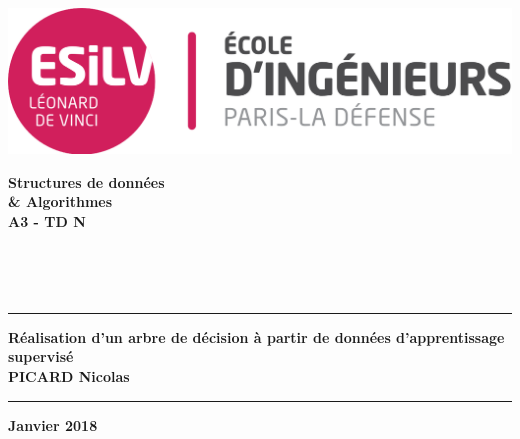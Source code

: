 \begin{titlepage}
	\begin{minipage}[c]{.46\linewidth}
		\begin{flushleft}
			\noindent
			\includegraphics[scale=0.13]{./img/Logo_ESILV.png}
		\end{flushleft}
	\end{minipage} \hfill
	\begin{minipage}[c]{.46\linewidth}
		\begin{flushright}
			\Large \textbf{Structures de données\\ \& Algorithmes\\A3 - TD N}
		\end{flushright}
	\end{minipage}
	\\
	\begin{center}
		\textsc{\large}\\[4.5cm]
		\rule{\linewidth}{.5pt}
		{\huge \bfseries Réalisation d'un arbre de décision à partir de données d'apprentissage supervisé\\[0.3cm]
		PICARD Nicolas\\}
		\rule{\linewidth}{.5pt}
	\vfill
	{\large \textbf{Janvier 2018}}
	\end{center}
\end{titlepage}